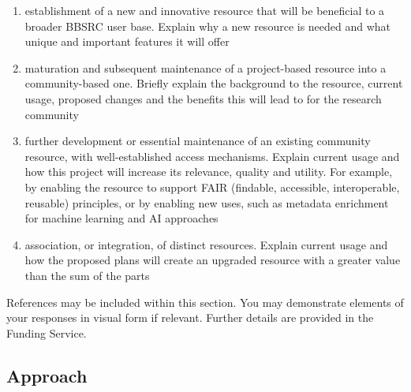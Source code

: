 \documentclass[11pt]{article}
\newenvironment{instruction}{%
    \begin{tcolorbox}[breakable,colback=red!5,colframe=red,title=Instruction]%
	}{%
    	\end{tcolorbox}%
	}
\begin{document}
\begin{instruction}
\begin{enumerate}

	\item establishment of a new and innovative resource that will be
beneficial to a broader BBSRC user base. Explain why a new resource is needed
and what unique and important features it will offer

	\item maturation and subsequent maintenance of a project-based resource
into a community-based one. Briefly explain the background to the resource,
current usage, proposed changes and the benefits this will lead to for the
research community

	\item further development or essential maintenance of an existing community
resource, with well-established access mechanisms. Explain current usage and
how this project will increase its relevance, quality and utility. For example,
by enabling the resource to support FAIR (findable, accessible, interoperable,
reusable) principles, or by enabling new uses, such as metadata enrichment for
machine learning and AI approaches

	\item association, or integration, of distinct resources. Explain current
usage and how the proposed plans will create an upgraded resource with a
greater value than the sum of the parts

\end{enumerate}

References may be included within this section.
You may demonstrate elements of your responses in visual form if relevant.
Further details are provided in the Funding Service.
\end{instruction}

\begin{bibunit}[apalike]

\putbib
\end{bibunit}

\pagebreak
\subsection{Approach}
\end{document}

